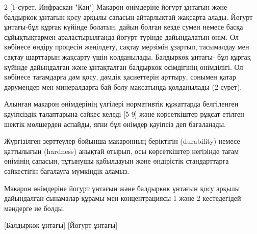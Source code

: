 \begin{multicols}{2}
[1-сурет. Инфраскан "Кан"]
\vspace{-0.5cm}
Макарон өнімдеріне йогурт ұнтағын және балдыркөк ұнтағын қосу арқылы
сапасын айтарлықтай жақсарта алады. Йогурт ұнтағы-бұл құрғақ күйінде
болатын, дайын болған кезде сумен немесе басқа сұйықтықтармен
араластырылғанда йогурт түрінде дайындалатын өнім. Ол көбінесе өндіру
процесін жеңілдету, сақтау мерзімін ұзартып, тасымалдау мен сақтау
шарттарын жақсарту үшін қолданылады. Балдыркөк ұнтағы- бұл құрғақ
күйінде дайындалған және ұнтақталған балдыркөк өсімдігінің өнімділігі.
Ол көбінесе тағамдарға дәм қосу, дәмдік қасиеттерін арттыру, сонымен
қатар дәрумендер мен минералдарға бай болу мақсатында қолданылады
(2-сурет).

Алынған макарон өнімдерінің үлгілері нормативтік құжаттарда белгіленген
қауіпсіздік талаптарына сәйкес келеді {[}5-9{]} және көрсеткіштер рұқсат
етілген шектік мөлшерден аспайды, яғни бұл өнімдер қауіпсіз деп
бағаланады.

Жүргізілген зерттеулер бойынша макаронның беріктігін (durability) немесе
қаттылығын (hardness) анықтай отырып, осы көрсеткіштер негізінде тағам
өнімінің сапасын, тұтынушы қабылдауын және өндірістік стандарттарға
сәйкестігін бағалауға мүмкіндік аламыз.

Макарон өнімдеріне йогурт ұнтағын және балдыркөк ұнтағын қосу арқылы
дайындалған сынамалар құрамы мен концентрациясы 1 және 2 кестедегідей
мәндерге ие болды.
\end{multicols}

\begin{figs}
    [Балдыркөк ұнтағы]
    [Йогурт ұнтағы]
\end{figs}

